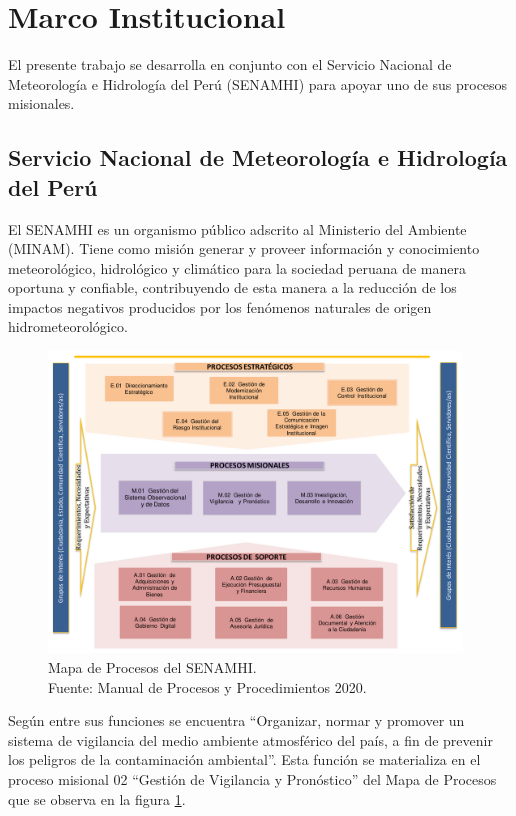 \section{Marco Institucional}

El presente trabajo se desarrolla en conjunto con el Servicio Nacional de 
Meteorología e Hidrología del Perú (SENAMHI) para apoyar uno de sus procesos 
misionales.

\subsection{Servicio Nacional de Meteorología e Hidrología del Perú}

El SENAMHI es un organismo público adscrito al Ministerio del Ambiente (MINAM). 
Tiene como misión generar y proveer información y conocimiento meteorológico, 
hidrológico y climático para la sociedad peruana de manera oportuna y 
confiable, contribuyendo de esta manera a la reducción de los impactos 
negativos producidos por los fenómenos naturales de origen hidrometeorológico.

\begin{figure}[H]
  \centering
  \includegraphics[height=8cm]{E_IMAGENES/2_MarcoTeorico/mapro}
  \caption[Mapa de Procesos del SENAMHI]{
    Mapa de Procesos del SENAMHI.\\
    Fuente: Manual de Procesos y Procedimientos 2020.
  }
  \label{fig:mapro}
\end{figure}

Según \cite{senamhi2020rof} entre sus funciones se encuentra ``Organizar, normar 
y promover un sistema de vigilancia del medio ambiente atmosférico del país, a 
fin de prevenir los peligros de la contaminación ambiental''. Esta función se 
materializa en el proceso misional 02 ``Gestión de Vigilancia y Pronóstico'' del 
Mapa de Procesos que se observa en la figura \ref{fig:mapro}.

